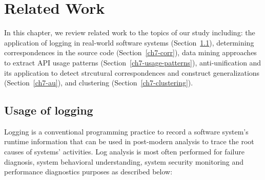 \chapter{Related Work}  \label{rw}
In this chapter, we review related work to the topics of our study including: the application of logging in real-world software systems (Section~\ref{logging}), determining correspondences in the source code (Section~\ref{ch7-corr}), data mining approaches to extract API usage patterns (Section~\ref{ch7-usage-patterns}), anti-unification and its application to detect strcutural correspondences and construct generalizations (Section~\ref{ch7-au}), and clustering (Section~\ref{ch7-clustering}).
\section{Usage of logging}  \label{logging}
Logging is a conventional programming practice to record a software system’s runtime information that can be used in post-modern analysis to trace the root causes of systems’ activities. Log analysis is most often performed for failure diagnosis, system behavioral understanding, system security monitoring and performance diagnostics purposes as described below:
